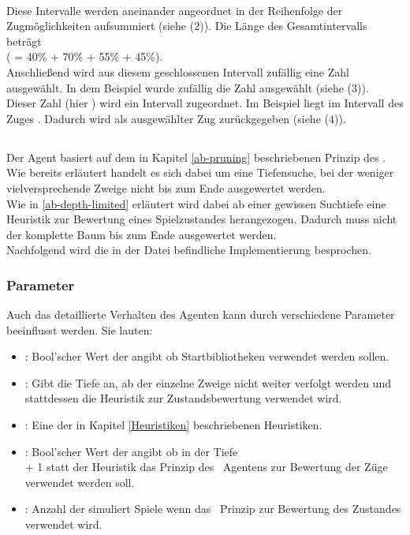 \\Diese Intervalle werden aneinander angeordnet in der Reihenfolge der Zugmöglichkeiten aufsummiert (siehe (2)). Die Länge des Gesamtintervalls beträgt  \\( = 40\% + 70\% + 55\% + 45\%).
\\Anschließend wird aus diesem geschlossenen Intervall zufällig eine Zahl ausgewählt. In dem Beispiel wurde zufällig die Zahl  ausgewählt (siehe (3)). 
\\Dieser Zahl (hier ) wird ein Intervall zugeordnet. Im Beispiel liegt  im Intervall des Zuges . Dadurch wird  als ausgewählter Zug zurückgegeben (siehe (4)).


\subsection{\abp}
Der Agent \mxZitat{\abp} basiert auf dem in Kapitel \ref{ab-pruning} beschriebenen Prinzip des \ababs. Wie bereits erläutert handelt es sich dabei um eine Tiefensuche, bei der weniger vielversprechende Zweige nicht bis zum Ende ausgewertet werden.
\\Wie in \ref{ab-depth-limited} erläutert wird dabei ab einer gewissen Suchtiefe eine Heuristik zur Bewertung eines Spielzustandes herangezogen. Dadurch muss nicht der komplette Baum bis zum Ende ausgewertet werden.  
\\Nachfolgend wird die in der Datei  befindliche Implementierung besprochen.
\subsubsection{Parameter}
Auch das detaillierte Verhalten des Agenten \mxZitat{\abp} kann durch verschiedene Parameter beeinflusst werden. Sie lauten:
\begin{itemize}
\item {}: Bool'scher Wert der angibt ob Startbibliotheken verwendet werden sollen.
\item {}: Gibt die Tiefe an, ab der einzelne Zweige nicht weiter verfolgt werden und stattdessen die Heuristik zur Zustandsbewertung verwendet wird.
\item {}: Eine der in Kapitel \ref{Heuristiken} beschriebenen Heuristiken.
\item {}: Bool'scher Wert der angibt ob in der Tiefe \\ + 1 statt der Heuristik das Prinzip des \mc\ Agentens zur Bewertung der Züge verwendet werden soll.
\item {}: Anzahl der simuliert Spiele wenn das \mc\ Prinzip zur Bewertung des Zustandes verwendet wird.
\end{itemize}

